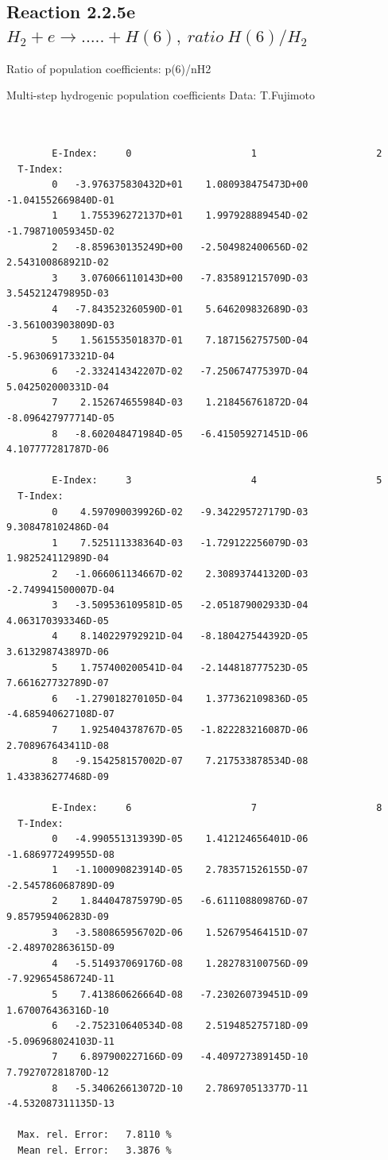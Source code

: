 \documentclass[12pt,dvips]{article}
\begin{document}
\newpage
\subsection{
Reaction 2.2.5e  $H_2 + e \rightarrow .....+H(6)   , \  ratio ~ H(6)/H_2 $
}

 Ratio of population coefficients: p(6)/nH2

 Multi-step hydrogenic population coefficients
 Data: T.Fujimoto


\begin{small}\begin{verbatim}


        E-Index:     0                     1                     2
  T-Index:
        0   -3.976375830432D+01    1.080938475473D+00   -1.041552669840D-01
        1    1.755396272137D+01    1.997928889454D-02   -1.798710059345D-02
        2   -8.859630135249D+00   -2.504982400656D-02    2.543100868921D-02
        3    3.076066110143D+00   -7.835891215709D-03    3.545212479895D-03
        4   -7.843523260590D-01    5.646209832689D-03   -3.561003903809D-03
        5    1.561553501837D-01    7.187156275750D-04   -5.963069173321D-04
        6   -2.332414342207D-02   -7.250674775397D-04    5.042502000331D-04
        7    2.152674655984D-03    1.218456761872D-04   -8.096427977714D-05
        8   -8.602048471984D-05   -6.415059271451D-06    4.107777281787D-06

        E-Index:     3                     4                     5
  T-Index:
        0    4.597090039926D-02   -9.342295727179D-03    9.308478102486D-04
        1    7.525111338364D-03   -1.729122256079D-03    1.982524112989D-04
        2   -1.066061134667D-02    2.308937441320D-03   -2.749941500007D-04
        3   -3.509536109581D-05   -2.051879002933D-04    4.063170393346D-05
        4    8.140229792921D-04   -8.180427544392D-05    3.613298743897D-06
        5    1.757400200541D-04   -2.144818777523D-05    7.661627732789D-07
        6   -1.279018270105D-04    1.377362109836D-05   -4.685940627108D-07
        7    1.925404378767D-05   -1.822283216087D-06    2.708967643411D-08
        8   -9.154258157002D-07    7.217533878534D-08    1.433836277468D-09

        E-Index:     6                     7                     8
  T-Index:
        0   -4.990551313939D-05    1.412124656401D-06   -1.686977249955D-08
        1   -1.100090823914D-05    2.783571526155D-07   -2.545786068789D-09
        2    1.844047875979D-05   -6.611108809876D-07    9.857959406283D-09
        3   -3.580865956702D-06    1.526795464151D-07   -2.489702863615D-09
        4   -5.514937069176D-08    1.282783100756D-09   -7.929654586724D-11
        5    7.413860626664D-08   -7.230260739451D-09    1.670076436316D-10
        6   -2.752310640534D-08    2.519485275718D-09   -5.096968024103D-11
        7    6.897900227166D-09   -4.409727389145D-10    7.792707281870D-12
        8   -5.340626613072D-10    2.786970513377D-11   -4.532087311135D-13

  Max. rel. Error:   7.8110 %
  Mean rel. Error:   3.3876 %

\end{verbatim}\end{small}
\end{document}
